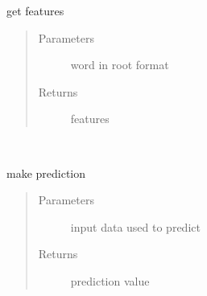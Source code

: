\documentclass[letterpaper,10pt,english]{sphinxmanual}
\begin{document}
\begin{fulllineitems}
\label{\detokenize{algorithms:algorithms.ira.ira_predictor.get_features}}
\sphinxAtStartPar
get features
\begin{quote}\begin{description}
\item[{Parameters}] \leavevmode
\sphinxAtStartPar
{} \textendash{} word in root format

\item[{Returns}] \leavevmode
\sphinxAtStartPar
features

\end{description}\end{quote}

\end{fulllineitems}


\begin{fulllineitems}
\label{\detokenize{algorithms:algorithms.ira.ira_predictor.Predictor}}~

\begin{fulllineitems}
\label{\detokenize{algorithms:algorithms.ira.ira_predictor.Predictor.make_prediction}}
\sphinxAtStartPar
make prediction
\begin{quote}\begin{description}
\item[{Parameters}] \leavevmode
\sphinxAtStartPar
{} \textendash{} input data used to predict

\item[{Returns}] \leavevmode
\sphinxAtStartPar
prediction value

\end{description}\end{quote}

\end{fulllineitems}


\end{fulllineitems}
\end{document}
